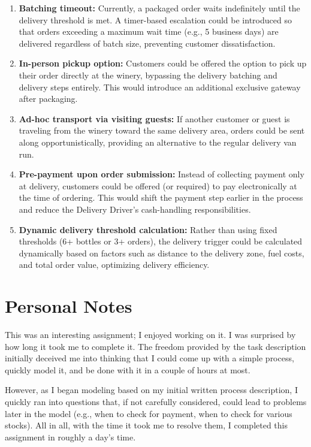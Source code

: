 \documentclass[11pt,a4paper]{article}
\begin{document}
\begin{enumerate}[leftmargin=*]
    \item \textbf{Batching timeout:} Currently, a packaged order waits indefinitely until the delivery threshold is met. A timer-based escalation could be introduced so that orders exceeding a maximum wait time (e.g., 5 business days) are delivered regardless of batch size, preventing customer dissatisfaction.

    \item \textbf{In-person pickup option:} Customers could be offered the option to pick up their order directly at the winery, bypassing the delivery batching and delivery steps entirely. This would introduce an additional exclusive gateway after packaging.

    \item \textbf{Ad-hoc transport via visiting guests:} If another customer or guest is traveling from the winery toward the same delivery area, orders could be sent along opportunistically, providing an alternative to the regular delivery van run.

    \item \textbf{Pre-payment upon order submission:} Instead of collecting payment only at delivery, customers could be offered (or required) to pay electronically at the time of ordering. This would shift the payment step earlier in the process and reduce the Delivery Driver's cash-handling responsibilities.

    \item \textbf{Dynamic delivery threshold calculation:} Rather than using fixed thresholds (6+ bottles or 3+ orders), the delivery trigger could be calculated dynamically based on factors such as distance to the delivery zone, fuel costs, and total order value, optimizing delivery efficiency.
\end{enumerate}

\section{Personal Notes}

This was an interesting assignment; I enjoyed working on it. I was surprised by how long it took me to complete it. The freedom provided by the task description initially deceived me into thinking that I could come up with a simple process, quickly model it, and be done with it in a couple of hours at most.

However, as I began modeling based on my initial written process description, I quickly ran into questions that, if not carefully considered, could lead to problems later in the model (e.g., when to check for payment, when to check for various stocks). All in all, with the time it took me to resolve them, I completed this assignment in roughly a day's time.
\end{document}
